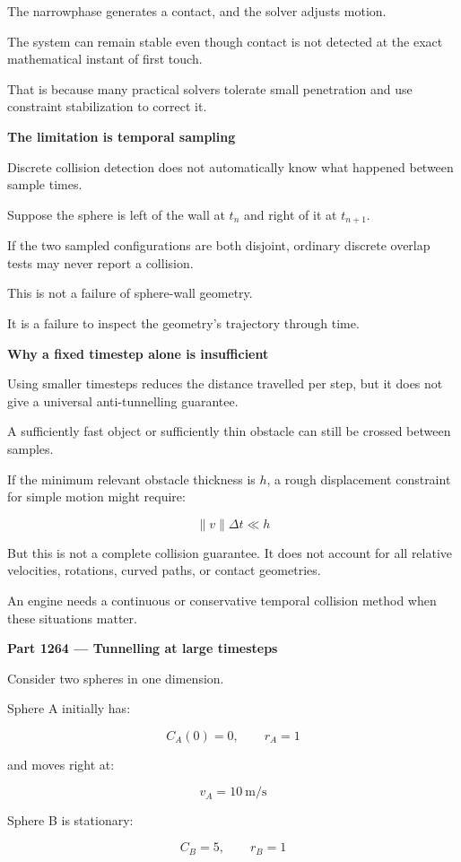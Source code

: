The narrowphase generates a contact, and the solver adjusts motion.

The system can remain stable even though contact is not detected at the exact mathematical instant of first touch.

That is because many practical solvers tolerate small penetration and use constraint stabilization to correct it.

\textbf{The limitation is temporal sampling}

Discrete collision detection does not automatically know what happened between sample times.

Suppose the sphere is left of the wall at \(t_n\) and right of it at \(t_{n+1}\).

If the two sampled configurations are both disjoint, ordinary discrete overlap tests may never report a collision.

This is not a failure of sphere-wall geometry.

It is a failure to inspect the geometry's trajectory through time.

\textbf{Why a fixed timestep alone is insufficient}

Using smaller timesteps reduces the distance travelled per step, but it does not give a universal anti-tunnelling guarantee.

A sufficiently fast object or sufficiently thin obstacle can still be crossed between samples.

If the minimum relevant obstacle thickness is \(h\), a rough displacement constraint for simple motion might require:

\[
\|v\|\Delta t\ll h
\]

But this is not a complete collision guarantee. It does not account for all relative velocities, rotations, curved paths, or contact geometries.

An engine needs a continuous or conservative temporal collision method when these situations matter.

\textbf{Part 1264 --- Tunnelling at large timesteps}

Consider two spheres in one dimension.

Sphere A initially has:

\[
C_A(0)=0,\qquad r_A=1
\]

and moves right at:

\[
v_A=10\ \mathrm{m/s}
\]

Sphere B is stationary:

\[
C_B=5,\qquad r_B=1
\]

